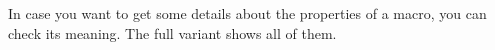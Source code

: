 \stopsection

\startsection[title=Introspection]

In case you want to get some details about the properties of a macro, you can
check its meaning. The full variant shows all of them.

\startbuffer

\permanent\tolerant\protected{}

\meaningless\MyFoo\par
\meaning    \MyFoo\par
\meaningfull\MyFoo\par
\stopbuffer

\typebuffer[option=TEX]

\startpacked \getbuffer \stoppacked

\stopsection


\stopdocument

